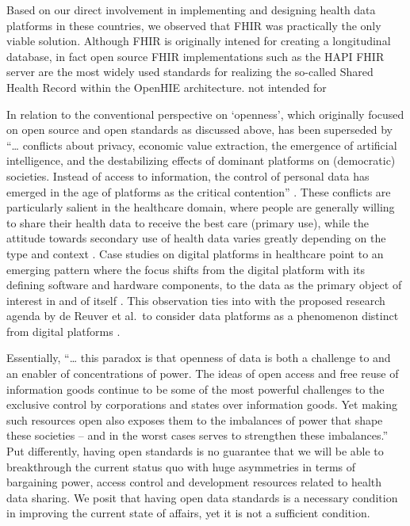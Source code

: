 \documentclass[
  authoryear]{elsarticle}
\begin{document}
Based on our direct involvement in implementing and designing health
data platforms in these countries, we observed that FHIR was practically
the only viable solution. Although FHIR is originally intened for
creating a longitudinal database, in fact open source FHIR
implementations such as the HAPI FHIR server are the most widely used
standards for realizing the so-called Shared Health Record within the
OpenHIE architecture. not intended for

In relation to the conventional perspective on `openness', which
originally focused on open source and open standards as discussed above,
has been superseded by ``\ldots{} conflicts about privacy, economic
value extraction, the emergence of artificial intelligence, and the
destabilizing effects of dominant platforms on (democratic) societies.
Instead of access to information, the control of personal data has
emerged in the age of platforms as the critical contention''
\citep{keller2021paradox}. These conflicts are particularly salient in
the healthcare domain, where people are generally willing to share their
health data to receive the best care (primary use), while the attitude
towards secondary use of health data varies greatly depending on the
type and context \citep{cascini2024health}. Case studies on digital
platforms in healthcare point to an emerging pattern where the focus
shifts from the digital platform with its defining software and hardware
components, to the data as the primary object of interest in and of
itself \citep{ozalp2022digital, alaimo2022organizations}. This
observation ties into with the proposed research agenda by de Reuver et
al.~to consider data platforms as a phenomenon distinct from digital
platforms \citep{dereuver2018digital, dereuver2022openness}.

Essentially, ``\ldots{} this paradox is that openness of data is both a
challenge to and an enabler of concentrations of power. The ideas of
open access and free reuse of information goods continue to be some of
the most powerful challenges to the exclusive control by corporations
and states over information goods. Yet making such resources open also
exposes them to the imbalances of power that shape these societies --
and in the worst cases serves to strengthen these imbalances.'' Put
differently, having open standards is no guarantee that we will be able
to breakthrough the current status quo with huge asymmetries in terms of
bargaining power, access control and development resources related to
health data sharing. We posit that having open data standards is a
necessary condition in improving the current state of affairs, yet it is
not a sufficient condition.
\end{document}
